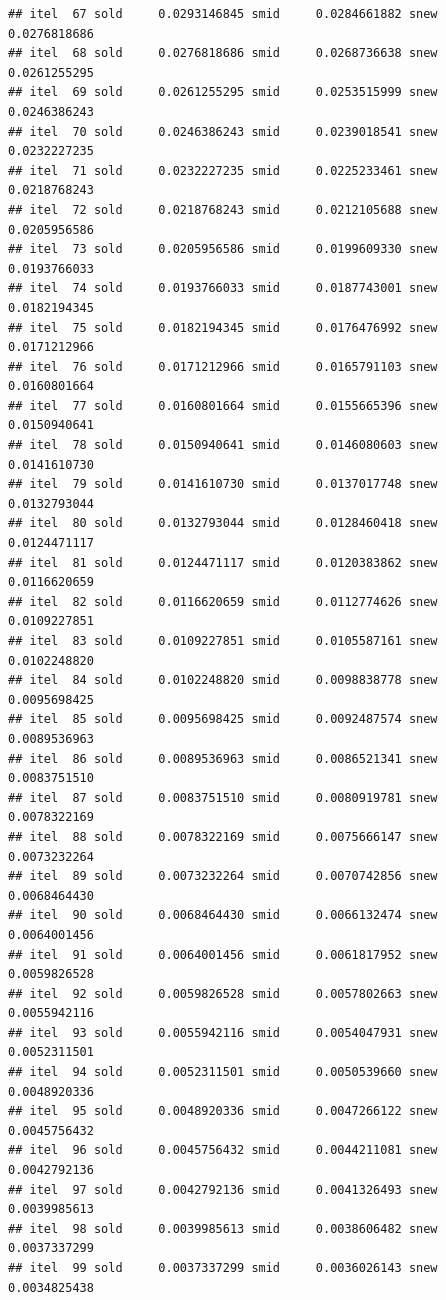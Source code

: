 \documentclass[
  12pt,
]{article}
\begin{document}
\begin{verbatim}
## itel  67 sold     0.0293146845 smid     0.0284661882 snew     0.0276818686 
## itel  68 sold     0.0276818686 smid     0.0268736638 snew     0.0261255295 
## itel  69 sold     0.0261255295 smid     0.0253515999 snew     0.0246386243 
## itel  70 sold     0.0246386243 smid     0.0239018541 snew     0.0232227235 
## itel  71 sold     0.0232227235 smid     0.0225233461 snew     0.0218768243 
## itel  72 sold     0.0218768243 smid     0.0212105688 snew     0.0205956586 
## itel  73 sold     0.0205956586 smid     0.0199609330 snew     0.0193766033 
## itel  74 sold     0.0193766033 smid     0.0187743001 snew     0.0182194345 
## itel  75 sold     0.0182194345 smid     0.0176476992 snew     0.0171212966 
## itel  76 sold     0.0171212966 smid     0.0165791103 snew     0.0160801664 
## itel  77 sold     0.0160801664 smid     0.0155665396 snew     0.0150940641 
## itel  78 sold     0.0150940641 smid     0.0146080603 snew     0.0141610730 
## itel  79 sold     0.0141610730 smid     0.0137017748 snew     0.0132793044 
## itel  80 sold     0.0132793044 smid     0.0128460418 snew     0.0124471117 
## itel  81 sold     0.0124471117 smid     0.0120383862 snew     0.0116620659 
## itel  82 sold     0.0116620659 smid     0.0112774626 snew     0.0109227851 
## itel  83 sold     0.0109227851 smid     0.0105587161 snew     0.0102248820 
## itel  84 sold     0.0102248820 smid     0.0098838778 snew     0.0095698425 
## itel  85 sold     0.0095698425 smid     0.0092487574 snew     0.0089536963 
## itel  86 sold     0.0089536963 smid     0.0086521341 snew     0.0083751510 
## itel  87 sold     0.0083751510 smid     0.0080919781 snew     0.0078322169 
## itel  88 sold     0.0078322169 smid     0.0075666147 snew     0.0073232264 
## itel  89 sold     0.0073232264 smid     0.0070742856 snew     0.0068464430 
## itel  90 sold     0.0068464430 smid     0.0066132474 snew     0.0064001456 
## itel  91 sold     0.0064001456 smid     0.0061817952 snew     0.0059826528 
## itel  92 sold     0.0059826528 smid     0.0057802663 snew     0.0055942116 
## itel  93 sold     0.0055942116 smid     0.0054047931 snew     0.0052311501 
## itel  94 sold     0.0052311501 smid     0.0050539660 snew     0.0048920336 
## itel  95 sold     0.0048920336 smid     0.0047266122 snew     0.0045756432 
## itel  96 sold     0.0045756432 smid     0.0044211081 snew     0.0042792136 
## itel  97 sold     0.0042792136 smid     0.0041326493 snew     0.0039985613 
## itel  98 sold     0.0039985613 smid     0.0038606482 snew     0.0037337299 
## itel  99 sold     0.0037337299 smid     0.0036026143 snew     0.0034825438 

\end{verbatim}
\end{document}
